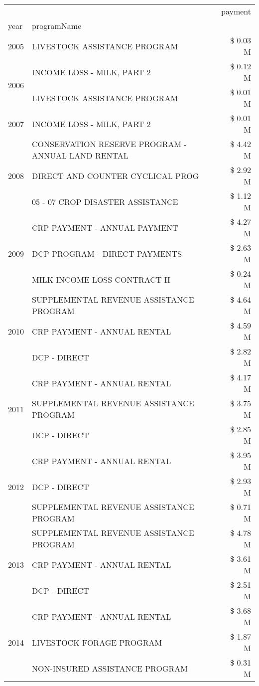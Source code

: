 \begin{tabular}{llr}
\toprule
 &  & payment \\
year & programName &  \\
\midrule
2005 & LIVESTOCK ASSISTANCE PROGRAM & \$ 0.03 M \\
\cline{1-3}
\multirow[t]{2}{*}{2006} & INCOME LOSS - MILK, PART 2 & \$ 0.12 M \\
 & LIVESTOCK ASSISTANCE PROGRAM & \$ 0.01 M \\
\cline{1-3}
2007 & INCOME LOSS - MILK, PART 2 & \$ 0.01 M \\
\cline{1-3}
\multirow[t]{3}{*}{2008} & CONSERVATION RESERVE PROGRAM - ANNUAL LAND RENTAL & \$ 4.42 M \\
 & DIRECT AND COUNTER CYCLICAL PROG & \$ 2.92 M \\
 & 05 - 07 CROP DISASTER ASSISTANCE & \$ 1.12 M \\
\cline{1-3}
\multirow[t]{3}{*}{2009} & CRP PAYMENT - ANNUAL PAYMENT & \$ 4.27 M \\
 & DCP PROGRAM - DIRECT PAYMENTS & \$ 2.63 M \\
 & MILK INCOME LOSS CONTRACT II & \$ 0.24 M \\
\cline{1-3}
\multirow[t]{3}{*}{2010} & SUPPLEMENTAL REVENUE ASSISTANCE PROGRAM & \$ 4.64 M \\
 & CRP PAYMENT - ANNUAL RENTAL & \$ 4.59 M \\
 & DCP - DIRECT & \$ 2.82 M \\
\cline{1-3}
\multirow[t]{3}{*}{2011} & CRP PAYMENT - ANNUAL RENTAL & \$ 4.17 M \\
 & SUPPLEMENTAL REVENUE ASSISTANCE PROGRAM & \$ 3.75 M \\
 & DCP - DIRECT & \$ 2.85 M \\
\cline{1-3}
\multirow[t]{3}{*}{2012} & CRP PAYMENT - ANNUAL RENTAL & \$ 3.95 M \\
 & DCP - DIRECT & \$ 2.93 M \\
 & SUPPLEMENTAL REVENUE ASSISTANCE PROGRAM & \$ 0.71 M \\
\cline{1-3}
\multirow[t]{3}{*}{2013} & SUPPLEMENTAL REVENUE ASSISTANCE PROGRAM & \$ 4.78 M \\
 & CRP PAYMENT - ANNUAL RENTAL & \$ 3.61 M \\
 & DCP - DIRECT & \$ 2.51 M \\
\cline{1-3}
\multirow[t]{3}{*}{2014} & CRP PAYMENT - ANNUAL RENTAL & \$ 3.68 M \\
 & LIVESTOCK FORAGE PROGRAM & \$ 1.87 M \\
 & NON-INSURED ASSISTANCE PROGRAM & \$ 0.31 M \\

\end{tabular}
